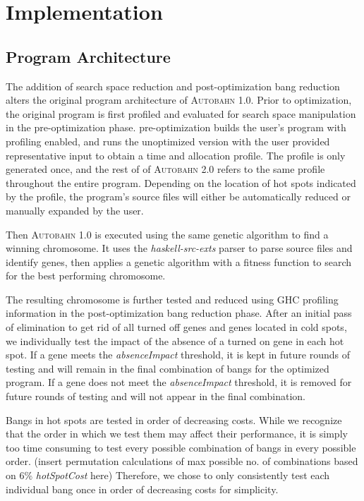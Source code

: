 \documentclass[format=sigplan]{acmart}
\newcommand{\hotspot}[0]{hot spot}
\newcommand{\hotspots}[0]{hot spots}
\newcommand{\coldspots}[0]{cold spots}
\newcommand{\hotspotcost}[0]{\textit{hotSpotCost}}
\newcommand{\Ao}[0]{\textsc{Autobahn 1.0}}
\newcommand{\At}[0]{\textsc{Autobahn 2.0}}
\newcommand{\preopt}[0]{pre-optimization}
\newcommand{\postopt}[0]{post-optimization}
\newcommand{\absim}[0]{\textit{absenceImpact}}
\begin{document}
\section{Implementation}

\subsection{Program Architecture}

The addition of search space reduction and \postopt{} bang reduction alters the original program architecture of \Ao{}. Prior to optimization, the original program is first profiled and evaluated for search space manipulation in the \preopt{} phase. \preopt{} builds the user's program with profiling enabled, and runs the unoptimized version with the user provided representative input to obtain a time and allocation profile. The profile is only generated once, and the rest of of \At{} refers to the same profile throughout the entire program. Depending on the location of \hotspots{} indicated by the profile, the program's source files will either be automatically reduced or manually expanded by the user. 

Then \Ao{} is executed using the same genetic algorithm to find a winning chromosome. It uses the \textit{haskell-src-exts} parser to parse source files and identify genes, then applies a genetic algorithm with a fitness function to search for the best performing chromosome.

The resulting chromosome is further tested and reduced using GHC profiling information in the \postopt{} bang reduction phase. After an initial pass of elimination to get rid of all turned off genes and genes located in \coldspots{}, we individually test the impact of the absence of a turned on gene in each \hotspot{}. If a gene meets the \absim{} threshold, it is kept in future rounds of testing and will remain in the final combination of bangs for the optimized program. If a gene does not meet the \absim{} threshold, it is removed for future rounds of testing and will not appear in the final combination. 

Bangs in \hotspots{} are tested in order of decreasing costs. While we recognize that the order in which we test them may affect their performance, it is simply too time consuming to test every possible combination of bangs in every possible order. (insert permutation calculations of max possible no. of combinations based on 6\% \hotspotcost{} here) Therefore, we chose to only consistently test each individual bang once in order of decreasing costs for simplicity. 
\end{document}
